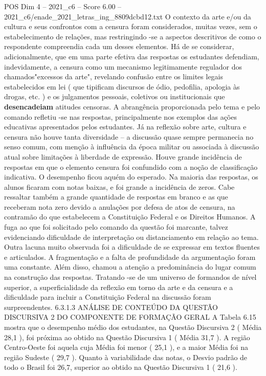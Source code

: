 \begin{textsample}{POS Dim 4 – 2021\_c6 – Score 6.00 – 2021\_c6/enade\_2021\_letras\_ing\_8809dcbd12.txt}
O contexto da arte e/ou da cultura e seus confrontos com a censura foram considerados, muitas vezes, sem o estabelecimento de relações, mas restringindo -se a aspectos descritivos de como o respondente compreendia cada um desses elementos.
Há de se considerar, adicionalmente, que em uma parte efetiva das respostas os estudantes defendiam, indevidamente, a censura como um mecanismo legitimamente regulador dos chamados"excessos da arte", revelando confusão entre os limites legais estabelecidos em lei ( que tipificam discursos de ódio, pedofilia, apologia às drogas, etc. ) e os julgamentos pessoais, coletivos ou institucionais que \textbf{desencadeiam} atitudes censoras.
A abrangência proporcionada pelo tema e pelo comando refletiu -se nas respostas, principalmente nos exemplos das ações educativas apresentados pelos estudantes.
Já na reflexão sobre arte, cultura e censura não houve tanta diversidade – a discussão quase sempre permanecia no senso comum, com menção à influência da época militar ou associada à discussão atual sobre limitações à liberdade de expressão.
Houve grande incidência de respostas em que o elemento censura foi confundido com a noção de classificação indicativa.
O desempenho ficou aquém do esperado.
Na maioria das respostas, os alunos ficaram com notas baixas, e foi grande a incidência de zeros.
Cabe ressaltar também a grande quantidade de respostas em branco e as que receberam nota zero devido a anulações por defesa de atos de censura, na contramão do que estabelecem a Constituição Federal e os Direitos Humanos.
A fuga ao que foi solicitado pelo comando da questão foi marcante, talvez evidenciando dificuldade de interpretação ou distanciamento em relação ao tema.
Outra lacuna muito observada foi a dificuldade de se expressar em textos fluentes e articulados.
A fragmentação e a falta de profundidade da argumentação foram uma constante.
Além disso, chamou a atenção a predominância do lugar comum na construção das respostas.
Tratando -se de um universo de formandos de nível superior, a superficialidade da reflexão em torno da arte e da censura e a dificuldade para incluir a Constituição Federal na discussão foram surpreendentes. 6.3.1.3 ANÁLISE DE CONTEÚDO DA QUESTÃO DISCURSIVA 2 DO COMPONENTE DE FORMAÇÃO GERAL A Tabela 6.15 mostra que o desempenho médio dos estudantes, na Questão Discursiva 2 ( Média 28,1 ), foi próxima ao obtido na Questão Discursiva 1 ( Média 31,7 ).
A região Centro-Oeste foi aquela cuja Média foi menor ( 25,1 ), e a maior Média foi na região Sudeste ( 29,7 ).
Quanto à variabilidade das notas, o Desvio padrão de todo o Brasil foi 26,7, superior ao obtido na Questão Discursiva 1 ( 21,6 ).

\end{textsample}
